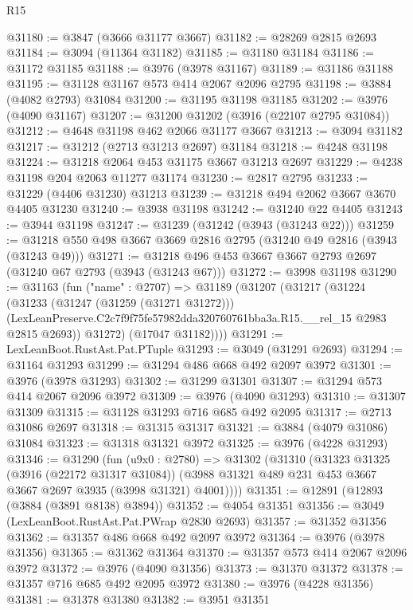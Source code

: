 \begin{lexlean}{R15}
\begin{coremodule}
@31180 := @3847 (@3666 @31177 @3667)
@31182 := @28269 @2815 @2693
@31184 := @3094 (@11364 @31182)
@31185 := @31180 @31184
@31186 := @31172 @31185
@31188 := @3976 (@3978 @31167)
@31189 := @31186 @31188
@31195 := @31128 @31167 @573 @414 @2067 @2096 @2795
@31198 := @3884 (@4082 @2793) @31084
@31200 := @31195 @31198 @31185
@31202 := @3976 (@4090 @31167)
@31207 := @31200 @31202 (@3916 (@22107 @2795 @31084))
@31212 := @4648 @31198 @462 @2066 @31177 @3667
@31213 := @3094 @31182
@31217 := @31212 (@2713 @31213 @2697) @31184
@31218 := @4248 @31198
@31224 := @31218 @2064 @453 @31175 @3667 @31213 @2697
@31229 := @4238 @31198 @204 @2063 @11277 @31174
@31230 := @2817 @2795
@31233 := @31229 (@4406 @31230) @31213
@31239 := @31218 @494 @2062 @3667 @3670 @4405 @31230
@31240 := @3938 @31198
@31242 := @31240 @22 @4405
@31243 := @3944 @31198
@31247 := @31239 (@31242 (@3943 (@31243 @22)))
@31259 := @31218 @550 @498 @3667 @3669 @2816 @2795 (@31240 @49 @2816 (@3943 (@31243 @49)))
@31271 := @31218 @496 @453 @3667 @3667 @2793 @2697 (@31240 @67 @2793 (@3943 (@31243 @67)))
@31272 := @3998 @31198
@31290 := @31163
    (fun ("name" : @2707) =>
    @31189
      (@31207
        (@31217
          (@31224
            (@31233
              (@31247 (@31259 (@31271 @31272)))
              (LexLeanPreserve.C2c7f9f75fe57982dda320760761bba3a.R15.__rel_15 @2983 @2815 @2693))
            @31272)
          (@17047 @31182))))
@31291 := LexLeanBoot.RustAst.Pat.PTuple
@31293 := @3049 (@31291 @2693)
@31294 := @31164 @31293
@31299 := @31294 @486 @668 @492 @2097 @3972
@31301 := @3976 (@3978 @31293)
@31302 := @31299 @31301
@31307 := @31294 @573 @414 @2067 @2096 @3972
@31309 := @3976 (@4090 @31293)
@31310 := @31307 @31309
@31315 := @31128 @31293 @716 @685 @492 @2095
@31317 := @2713 @31086 @2697
@31318 := @31315 @31317
@31321 := @3884 (@4079 @31086) @31084
@31323 := @31318 @31321 @3972
@31325 := @3976 (@4228 @31293)
@31346 := @31290
    (fun (u9x0 : @2780) =>
    @31302
      (@31310
        (@31323
          @31325
          (@3916 (@22172 @31317 @31084))
          (@3988 @31321 @489 @231 @453 @3667 @3667 @2697 @3935 (@3998 @31321) @4001))))
@31351 := @12891 (@12893 (@3884 (@3891 @8138) @3894))
@31352 := @4054 @31351
@31356 := @3049 (LexLeanBoot.RustAst.Pat.PWrap @2830 @2693)
@31357 := @31352 @31356
@31362 := @31357 @486 @668 @492 @2097 @3972
@31364 := @3976 (@3978 @31356)
@31365 := @31362 @31364
@31370 := @31357 @573 @414 @2067 @2096 @3972
@31372 := @3976 (@4090 @31356)
@31373 := @31370 @31372
@31378 := @31357 @716 @685 @492 @2095 @3972
@31380 := @3976 (@4228 @31356)
@31381 := @31378 @31380
@31382 := @3951 @31351

\end{coremodule}
\end{lexlean}

